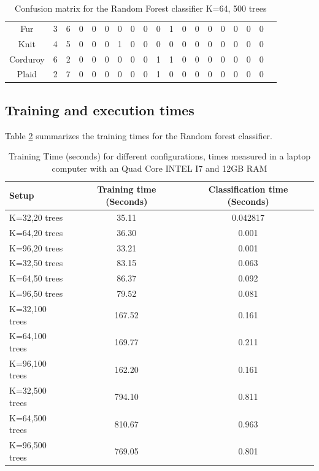 \documentclass[10pt,twocolumn,letterpaper]{article}
\begin{document}
\begin{table}[ht!]
\begin{tabular}{c | c | c |c |c |c |c |c |c |c |c |c |c |c |c |c |c | c | c }
Fur &   3   &  6   &  0   &  0   &  0   &  0   &  0   &  0  &   0   &  1   &  0  &   0  &   0  &   0   &  0  &   0   &  0\\
Knit &  4   &  5   &  0   &  0   &  0   &  1   &  0   &  0  &   0   &  0   &  0  &   0  &   0  &   0   &  0  &   0   &  0\\
Corduroy &   6   & 2   &  0    & 0    & 0    & 0    & 0    & 0   &  1    & 1    & 0    & 0   &  0   &  0    & 0   &  0   &  0\\
Plaid &   2   &  7  &   0   &  0   &  0   &  0   &  0   &  0   &  1   &  0   &  0   &  0   &  0  &   0   &  0  &   0  &   0\\
\end{tabular}
\caption{Confusion matrix for the Random Forest classifier K=64, 500 trees}
\label{table:table4}
\end{table}

\subsection{Training and execution times}
Table \ref{table:times} summarizes the training times for the Random forest classifier.

\begin{table}[ht!]
\centering
\begin{tabular}{ l | c | c}
Setup & Training time (Seconds) & Classification time (Seconds)    \\
\hline	
K=32,20 trees & 35.11 & 0.042817\\
K=64,20 trees &   36.30 & 0.001 \\
K=96,20 trees &  33.21  & 0.001 \\
K=32,50 trees & 83.15  & 0.063 \\
K=64,50 trees &  86.37 & 0.092 \\
K=96,50 trees &   79.52 & 0.081 \\
K=32,100 trees &  167.52 & 0.161 \\
K=64,100 trees &  169.77 & 0.211 \\
K=96,100 trees &  162.20 & 0.161\\
K=32,500 trees &  794.10 & 0.811 \\
K=64,500 trees &  810.67 & 0.963 \\
K=96,500 trees &  769.05 & 0.801 \\

\end{tabular}
\caption{Training Time (seconds) for different configurations, times measured in a laptop computer with an Quad Core INTEL I7 and 12GB RAM}
\label{table:times}
\end{table}
\end{document}
